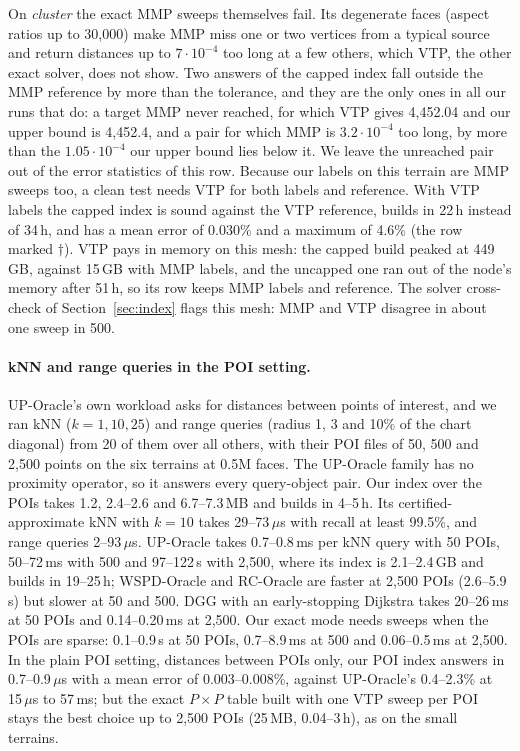 \documentclass[sigconf,nonacm,screen]{acmart}
\begin{document}
On \emph{cluster} the exact MMP sweeps themselves fail. Its degenerate faces (aspect ratios up to 30,000) make MMP
miss one or two vertices from a typical source and return distances up to $7\cdot10^{-4}$ too long at a few others,
which VTP, the other exact solver, does not show. Two answers of the capped index fall outside the MMP reference by
more than the tolerance, and they are the only ones in all our runs that do: a target MMP never reached, for which
VTP gives 4,452.04 and our upper bound is 4,452.4, and a pair for which MMP is $3.2\cdot10^{-4}$ too long, by more than
the $1.05\cdot10^{-4}$ our upper bound lies below it. We leave the unreached pair out of the error statistics of this
row. Because our labels on this terrain are MMP sweeps too, a clean test needs VTP for both labels and reference.
With VTP labels the capped index is sound against the VTP reference, builds in 22\,h instead of 34\,h, and has a mean
error of 0.030\% and a maximum of 4.6\% (the row marked $\dagger$). VTP pays in memory on this mesh: the capped
build peaked at 449\,GB, against 15\,GB with MMP labels, and the uncapped one ran out of the node's memory after 51\,h,
so its row keeps MMP labels and reference. The
solver cross-check of Section~\ref{sec:index} flags this mesh: MMP and VTP disagree in about one sweep in 500.

\paragraph{kNN and range queries in the POI setting.}
UP-Oracle's own workload asks for distances between points of interest, and we ran kNN ($k=1,10,25$) and range
queries (radius 1, 3 and 10\% of the chart diagonal) from 20 of them over all others, with their POI files of 50,
500 and 2,500 points on the six terrains at 0.5M faces. The UP-Oracle family has no proximity operator, so it
answers every query-object pair. Our index over the POIs takes 1.2, 2.4--2.6 and 6.7--7.3\,MB and builds in
4--5\,h. Its certified-approximate kNN with $k=10$ takes 29--73\,$\mu$s with recall at least 99.5\%, and range
queries 2--93\,$\mu$s. UP-Oracle takes 0.7--0.8\,ms per kNN query with 50 POIs, 50--72\,ms with 500 and 97--122\,s
with 2,500, where its index is 2.1--2.4\,GB and builds in 19--25\,h; WSPD-Oracle and RC-Oracle are faster at 2,500
POIs (2.6--5.9\,s) but slower at 50 and 500. DGG with an early-stopping Dijkstra takes 20--26\,ms at 50 POIs and
0.14--0.20\,ms at 2,500. Our exact mode needs sweeps when the POIs are sparse: 0.1--0.9\,s at 50 POIs,
0.7--8.9\,ms at 500 and 0.06--0.5\,ms at 2,500. In the plain POI setting, distances between POIs only, our POI index
answers in 0.7--0.9\,$\mu$s with a mean error of 0.003--0.008\%, against UP-Oracle's 0.4--2.3\% at 15\,$\mu$s to
57\,ms; but the exact $P\times P$ table built with one VTP sweep per POI stays the best choice up to 2,500 POIs
(25\,MB, 0.04--3\,h), as on the small terrains.
\end{document}

